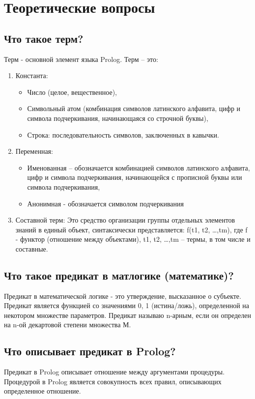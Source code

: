 \documentclass[a4paper,12pt]{article}
\begin{document}
\section*{Теоретические вопросы}

\subsection*{Что такое терм?}
Терм - основной элемент языка Prolog. Терм – это:
\begin{enumerate}
	\item Константа: 
	\begin{itemize}
		\item Число (целое, вещественное),
		\item Символьный атом (комбинация символов латинского алфавита, цифр и символа подчеркивания, начинающаяся со строчной буквы),
		\item Строка: последовательность символов, заключенных в кавычки.
	\end{itemize}
	\item Переменная:
	\begin{itemize}
		\item Именованная – обозначается комбинацией символов латинского алфавита, цифр и символа подчеркивания, начинающейся с прописной буквы или символа подчеркивания,
		\item Анонимная  - обозначается символом подчеркивания
	\end{itemize}
	\item Составной терм:
	Это средство организации группы отдельных элементов знаний в единый  объект,  синтаксически представляется: f(t1, t2, …,tm), где f -  функтор (отношение между объектами), t1, t2, …,tm – термы, в том  числе  и составные.
\end{enumerate}
\subsection*{Что такое предикат в матлогике (математике)?}
Предикат в математической логике - это утверждение, высказанное о субъекте. Предикат является функцией со значениями {0, 1} (истина/ложь), определенной на некотором множестве параметров. Предикат называю n-арным, если он определен на n-ой декартовой степени множества М.
\subsection*{Что описывает предикат в Prolog?}
Предикат в Prolog описывает отношение между аргументами процедуры. Процедурой в Prolog является совокупность всех правил, описывающих определенное отношение.
\end{document}
